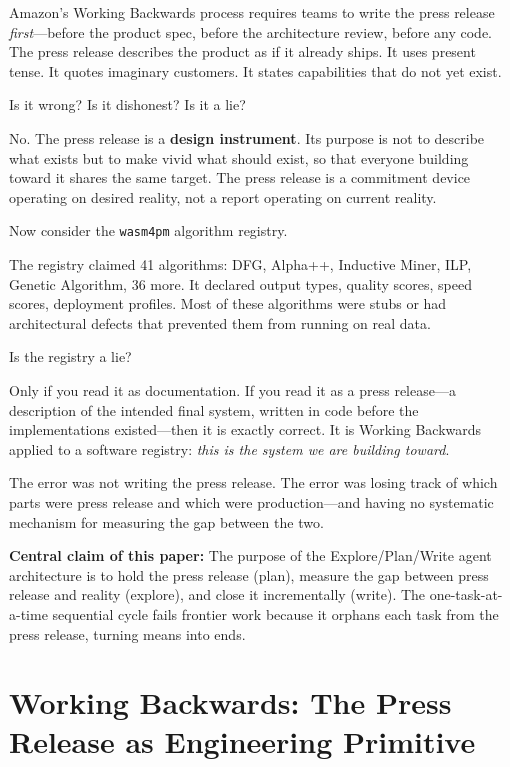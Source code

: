 \documentclass[11pt,a4paper]{article}
\newcommand{\code}[1]{\texttt{#1}}
\begin{document}
Amazon's Working Backwards process requires teams to write the press release
\emph{first}---before the product spec, before the architecture review, before
any code.  The press release describes the product as if it already ships.  It
uses present tense.  It quotes imaginary customers.  It states capabilities
that do not yet exist.

Is it wrong?  Is it dishonest?  Is it a lie?

No.  The press release is a \textbf{design instrument}.  Its purpose is not to
describe what exists but to make vivid what should exist, so that everyone
building toward it shares the same target.  The press release is a commitment
device operating on desired reality, not a report operating on current reality.

Now consider the \code{wasm4pm} algorithm registry.

The registry claimed 41 algorithms: DFG, Alpha++, Inductive Miner, ILP, Genetic
Algorithm, 36 more.  It declared output types, quality scores, speed scores,
deployment profiles.  Most of these algorithms were stubs or had architectural
defects that prevented them from running on real data.

Is the registry a lie?

Only if you read it as documentation.  If you read it as a press release---a
description of the intended final system, written in code before the
implementations existed---then it is exactly correct.  It is Working Backwards
applied to a software registry: \emph{this is the system we are building
toward}.

The error was not writing the press release.  The error was losing track of
which parts were press release and which were production---and having no
systematic mechanism for measuring the gap between the two.

\begin{callout}
  \textbf{Central claim of this paper:} The purpose of the Explore/Plan/Write
  agent architecture is to hold the press release (plan), measure the gap
  between press release and reality (explore), and close it incrementally
  (write).  The one-task-at-a-time sequential cycle fails frontier work
  because it orphans each task from the press release, turning means into ends.
\end{callout}

\section{Working Backwards: The Press Release as Engineering Primitive}
\end{document}
